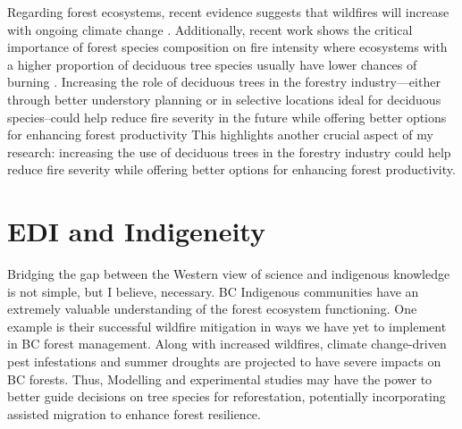 \documentclass[11pt,letter]{article}
\begin{document}
Regarding forest ecosystems, recent evidence suggests that wildfires will increase with ongoing climate change \citep{wasserman_climate_2023}. 
Additionally, recent work shows the critical importance of forest species composition on fire intensity where ecosystems with a higher proportion of deciduous tree species usually have lower chances of burning \citep{park_impact_2024}. 
Increasing the role of deciduous trees in the forestry industry---either through better understory planning or in selective locations ideal for deciduous species--could help reduce fire severity in the future while offering better options for enhancing forest productivity
This highlights another crucial aspect of my research: increasing the use of deciduous trees in the forestry industry could help reduce fire severity while offering better options for enhancing forest productivity.

\section *{EDI and Indigeneity}
Bridging the gap between the Western view of science and indigenous knowledge is not simple, but I believe, necessary. BC Indigenous communities have an extremely valuable understanding of the forest ecosystem functioning. One example is their successful wildfire mitigation in ways we have yet to implement in BC forest management. Along with increased wildfires, climate change-driven pest infestations and summer droughts are projected to have severe impacts on BC forests. \citep{williams_climate_2002} Thus, Modelling and experimental studies may have the power to better guide decisions on tree species for reforestation, potentially incorporating assisted migration to enhance forest resilience. \citep{aitken_time_2016}
\end{document}

